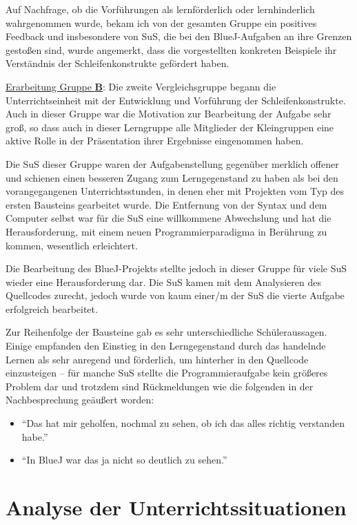 \documentclass[paper=a4, DIV=13, BCOR=8mm, oneside=on, onecolumn=on, open = any, titlepage =on, parskip =half-, headsepline = on, footsepline = off, chapterprefix = on, sectionprefix = on, appendixprefix = off, fontsize = 12pt, numbers = noenddot, abstract = off]{scrreprt}
\begin{document}
Auf Nachfrage, ob die Vorführungen als lernförderlich oder lernhinderlich wahrgenommen wurde, bekam ich von der gesamten Gruppe ein positives Feedback und insbesondere von SuS, die bei den BlueJ-Aufgaben an ihre Grenzen gestoßen sind, wurde angemerkt, dass die vorgestellten konkreten Beispiele ihr Verständnis der Schleifenkonstrukte gefördert haben.


\underline{Erarbeitung Gruppe \textsc{\textbf{B}}}: Die zweite Vergleichsgruppe begann die Unterrichtseinheit mit der Entwicklung und Vorführung der Schleifenkonstrukte. Auch in dieser Gruppe war die Motivation zur Bearbeitung der Aufgabe sehr groß, so dass auch in dieser Lerngruppe alle Mitglieder der Kleingruppen eine aktive Rolle in der Präsentation ihrer Ergebnisse eingenommen haben. 

Die SuS dieser Gruppe waren der Aufgabenstellung gegenüber merklich offener und schienen einen besseren Zugang zum Lerngegenstand zu haben als bei den vorangegangenen Unterrichtsstunden, in denen eher mit Projekten vom Typ des ersten Bausteins gearbeitet wurde. Die Entfernung von der Syntax und dem Computer selbst war für die SuS eine willkommene Abwechslung und hat die Herausforderung, mit einem neuen Programmierparadigma in Berührung zu kommen, wesentlich erleichtert.

Die Bearbeitung des BlueJ-Projekts stellte jedoch in dieser Gruppe für viele SuS wieder eine Herausforderung dar. Die SuS kamen mit dem Analysieren des Quellcodes zurecht, jedoch wurde von kaum einer/m der SuS die vierte Aufgabe erfolgreich bearbeitet. 

Zur Reihenfolge der Bausteine gab es sehr unterschiedliche Schüleraussagen. Einige empfanden den Einstieg in den Lerngegenstand durch das handelnde Lernen als sehr anregend und förderlich, um hinterher in den Quellcode einzusteigen -- für manche SuS stellte die Programmieraufgabe kein größeres Problem dar und trotzdem sind Rückmeldungen wie die folgenden in der Nachbesprechung geäußert worden:

\singlespacing
\begin{itemize}
\item "`Das hat mir geholfen, nochmal zu sehen, ob ich das alles richtig verstanden habe."'
\item "`In BlueJ war das ja nicht so deutlich zu sehen."'
\end{itemize}
\onehalfspacing


\par \singlespacing
 \section{Analyse der Unterrichtssituationen}
 \label{analyse}
\onehalfspacing
\vspace*{-0.5cm}
\par \singlespacing
\end{document}
